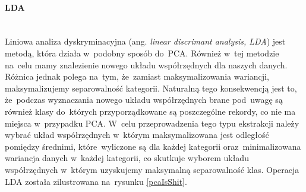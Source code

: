 \paragraph{LDA}\mbox{}\\
Liniowa analiza dyskryminacyjna (ang. \textit{linear discrimant analysis, LDA})\cite{ldaBriefTutorial} jest metodą, która działa w~podobny sposób do~PCA. Również w~tej metodzie na~celu mamy znalezienie nowego układu współrzędnych dla naszych danych. Różnica jednak polega na~tym, że~zamiast maksymalizowania wariancji, maksymalizujemy separowalność kategorii. Naturalną tego konsekwencją jest to, że~podczas wyznaczania nowego układu współrzędnych brane pod~uwagę są również klasy do~których przyporządkowane są poszczególne rekordy, co nie ma miejsca w~przypadku PCA. W~celu przeprowadzenia tego typu ekstrakcji należy wybrać układ współrzędnych w~którym maksymalizowana jest odległość pomiędzy średnimi, które~wyliczone są dla każdej kategorii oraz~minimalizowana wariancja danych w~każdej kategorii, co skutkuje wyborem układu współrzędnych w~którym uzyskujemy maksymalną separowalność klas. Operacja LDA została zilustrowana na~rysunku \ref{pcaIsShit}.



